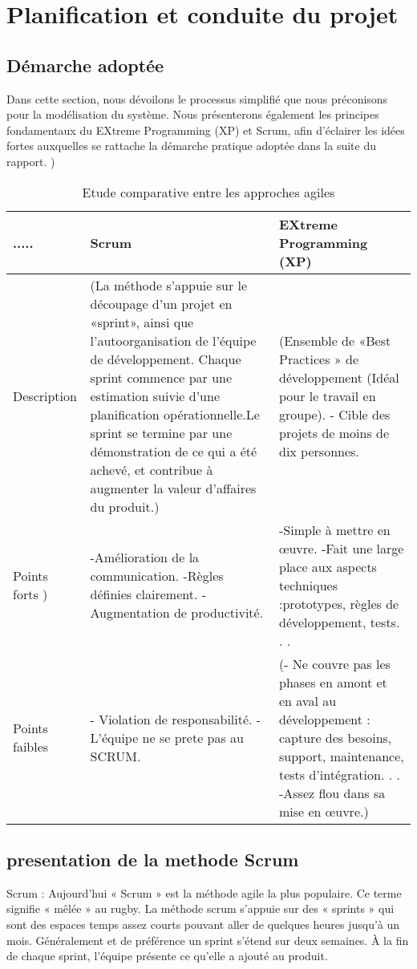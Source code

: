 \section{Planification et conduite du projet}
\subsection{Démarche adoptée}
Dans cette section, nous dévoilons le processus simplifié que nous préconisons pour la modélisation du système.
Nous présenterons également les principes fondamentaux du EXtreme Programming (XP) et
Scrum, afin d’éclairer les idées fortes auxquelles se rattache la démarche pratique adoptée dans
la suite du rapport.
	)
\begin{table} [!ht]
	\centering
	\begin{tabular} { | m{5em} | m{7cm}| m{6cm} | }\hline
		\rowcolor[gray]{0.85}
		..... & Scrum &EXtreme Programming (XP) \\  \hline
		Description      & \small (La méthode s’appuie sur le découpage d’un
		projet en «sprint»,
		ainsi que l’autoorganisation de
		l’équipe de développement.
		Chaque sprint commence par une
		estimation suivie
		d’une planification
		opérationnelle.Le
		sprint se termine par
		une démonstration de
		ce qui a été achevé, et
		contribue à augmenter
		la valeur d’affaires du
		produit.)
		& \small (Ensemble de «Best
		Practices » de développement (Idéal pour
		le travail en groupe).
		- Cible des projets
		de moins de dix personnes.    \\    \hline
		Points forts )     &-Amélioration de la
		communication.
		-Règles définies clairement.
		-Augmentation de
		productivité.
		& -Simple à mettre en
		œuvre.
		-Fait une large place
		aux aspects techniques :prototypes,
		règles de développement, tests. . .  \\    \hline
		Points faibles    &  - Violation de responsabilité.
		-L’équipe ne se prete
		pas au SCRUM.&\small (- Ne couvre pas les
		phases en amont et
		en aval au développement : capture des besoins, support, maintenance, tests d’intégration. . .
		-Assez flou dans sa
		mise en œuvre.)   \\    \hline	
		
	\end{tabular}
	\caption{ Etude comparative entre les approches agiles}\label{tab: first-table}	
\end{table}

\subsection{presentation de la methode Scrum }
Scrum : Aujourd’hui « Scrum » est la méthode agile la plus populaire. Ce terme signifie «
mêlée » au rugby. La méthode scrum s’appuie sur des « sprints » qui sont des espaces temps
assez courts pouvant aller de quelques heures jusqu’à un mois. Généralement et de préférence
un sprint s’étend sur deux semaines. À la fin de chaque sprint, l’équipe présente ce qu’elle a
ajouté au produit.
